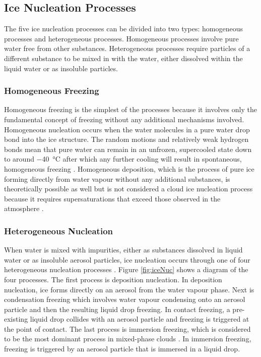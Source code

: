 \subsection{Ice Nucleation Processes}
The five ice nucleation processes can be divided into two types: homogeneous processes and heterogeneous processes. Homogeneous processes involve pure water free from other substances. Heterogeneous processes require particles of a different substance to be mixed in with the water, either dissolved within the liquid water or as insoluble particles.

\subsubsection{Homogeneous Freezing}
Homogeneous freezing is the simplest of the processes because it involves only the fundamental concept of freezing without any additional mechanisms involved. Homogeneous nucleation occurs when the water molecules in a pure water drop bond into the ice structure. The random motions and relatively weak hydrogen bonds mean that pure water can remain in an unfrozen, supercooled state down to around \SI{-40}{\degreeCelsius} after which any further cooling will result in spontaneous, homogeneous freezing \citep{rog1989}. Homogeneous deposition, which is the process of pure ice forming directly from water vapour without any additional substances, is theoretically possible as well but is not considered a cloud ice nucleation process because it requires supersaturations that exceed those observed in the atmosphere \citep{vali2015}.

\subsubsection{Heterogeneous Nucleation}
When water is mixed with impurities, either as substances dissolved in liquid water or as insoluble aerosol particles, ice nucleation occurs through one of four heterogeneous nucleation processes \citep{rog1989,lamb2011,kanj2017}. Figure \ref{fig:iceNuc} shows a diagram of the four processes. The first process is deposition nucleation. In deposition nucleation, ice forms directly on an aerosol from the water vapour phase. Next is condensation freezing which involves water vapour condensing onto an aerosol particle and then the resulting liquid drop freezing. In contact freezing, a pre-existing liquid drop collides with an aerosol particle and freezing is triggered at the point of contact. The last process is immersion freezing, which is considered to be the most dominant process in mixed-phase clouds \citep{aug2014,tobo2016}. In immersion freezing, freezing is triggered by an aerosol particle that is immersed in a liquid drop.

